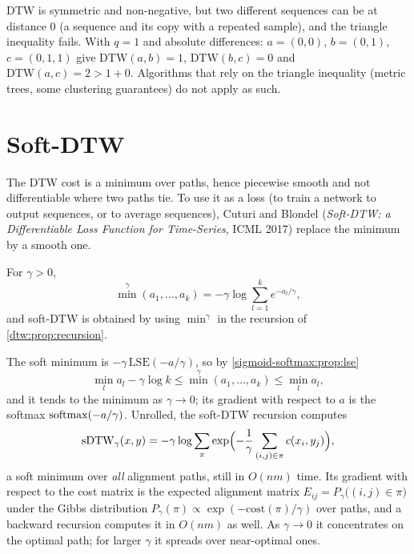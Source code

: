 \begin{notechapter}
\begin{pitfall}
DTW is symmetric and non-negative, but two different sequences can be at distance $0$ (a
sequence and its copy with a repeated sample), and the triangle inequality fails. With
$q = 1$ and absolute differences: $a = (0, 0)$, $b = (0, 1)$, $c = (0, 1, 1)$ give $\mathrm{DTW}(a, b) = 1$,
$\mathrm{DTW}(b, c) = 0$ and $\mathrm{DTW}(a, c) = 2>1 + 0$. Algorithms that rely on the triangle inequality
(metric trees, some clustering guarantees) do not apply as such.
\end{pitfall}

\section{Soft-DTW}\label{dtw:sec:soft}

The DTW cost is a minimum over paths, hence piecewise smooth and not differentiable
where two paths tie. To use it as a loss (to train a network to output sequences, or to
average sequences), Cuturi and Blondel (\emph{Soft-DTW: a Differentiable Loss Function for
Time-Series}, ICML 2017) replace the minimum by a smooth one.

\begin{definition}
For $\gamma>0$,
\[
  \operatorname{min}^\gamma(a_1,\dots,a_k) = -\gamma\log\sum_{l=1}^ke^{-a_l/\gamma},
\]
and soft-DTW is obtained by using $\operatorname{min}^\gamma$ in the recursion of \cref{dtw:prop:recursion}.
\end{definition}

The soft minimum is $-\gamma\,\mathrm{LSE}(-a/\gamma)$, so by \cref{sigmoid-softmax:prop:lse}
\[
  \min_la_l - \gamma\log k\leq\operatorname{min}^\gamma(a_1,\dots,a_k)\leq\min_la_l,
\]
and it tends to the minimum as $\gamma\to0$; its gradient with respect to $a$ is the softmax
$\operatorname{softmax}(-a/\gamma)$. Unrolled, the soft-DTW recursion computes
\[
  \mathrm{sDTW}_\gamma(x, y) = -\gamma\log\sum_\pi\exp\Bigl(-\frac1\gamma\sum_{(i,j)\in\pi}c(x_i, y_j)\Bigr),
\]
a soft minimum over \emph{all} alignment paths, still in $O(nm)$ time. Its gradient with
respect to the cost matrix is the expected alignment matrix
$E_{ij} = P_\gamma\bigl((i, j)\in\pi\bigr)$ under the Gibbs distribution $P_\gamma(\pi)\propto\exp(-\mathrm{cost}(\pi)/\gamma)$ over paths, and a
backward recursion computes it in $O(nm)$ as well. As $\gamma\to0$ it concentrates on the optimal
path; for larger $\gamma$ it spreads over near-optimal ones.


\end{notechapter}
